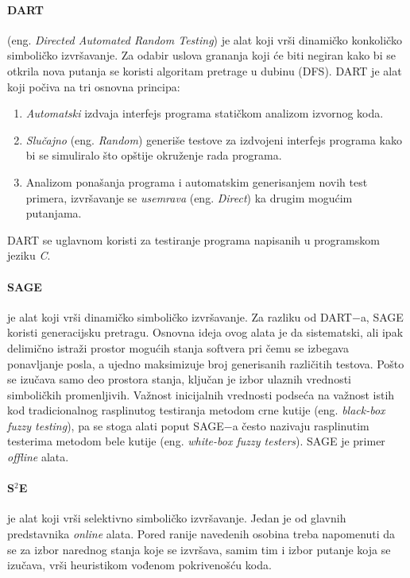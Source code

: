 \documentclass[12pt,oneside]{memoir}
\begin{document}
\paragraph{DART}\cite{dart} (eng. \textit{Directed Automated Random Testing}) je alat koji vrši dinamičko konkoličko simboličko izvršavanje. Za odabir uslova grananja koji će biti negiran kako bi se otkrila nova putanja se koristi algoritam pretrage u dubinu (DFS). DART je alat koji počiva na tri osnovna principa:
\begin{enumerate}
    \item\textit{Automatski} izdvaja interfejs programa statičkom analizom izvornog koda.
    
    \item\textit{Slučajno} (eng. \textit{Random}) generiše testove za izdvojeni interfejs programa kako bi se simuliralo što opštije okruženje rada programa.
    
    \item Analizom ponašanja programa i automatskim generisanjem novih test primera, izvršavanje se \textit{usemrava} (eng. \textit{Direct}) ka drugim mogućim putanjama.
\end{enumerate}

\noindent DART se uglavnom koristi za testiranje programa napisanih u programskom jeziku \textit{C}.

\paragraph{SAGE}\cite{sage} je alat koji vrši dinamičko simboličko izvršavanje. Za razliku od DART$-$a, SAGE koristi generacijsku pretragu. Osnovna ideja ovog alata je da sistematski, ali ipak delimično istraži prostor mogućih stanja softvera pri čemu se izbegava ponavljanje posla, a ujedno maksimizuje broj generisanih različitih testova. Pošto se izučava samo deo prostora stanja, ključan je izbor ulaznih vrednosti simboličkih promenljivih. Važnost inicijalnih vrednosti podseća na važnost istih kod tradicionalnog rasplinutog testiranja metodom crne kutije (eng. \textit{black-box fuzzy testing}), pa se stoga alati poput SAGE$-$a često nazivaju rasplinutim testerima metodom bele kutije (eng. \textit{white-box fuzzy testers}). SAGE je primer \textit{offline} alata. 

\paragraph{S$^2$E}\cite{s2e} je alat koji vrši selektivno simboličko izvršavanje. Jedan je od glavnih predstavnika \textit{online} alata. Pored ranije navedenih osobina treba napomenuti da se za izbor narednog stanja koje se izvršava, samim tim i izbor putanje koja se izučava, vrši heuristikom vođenom pokrivenošću koda. 
\end{document}
